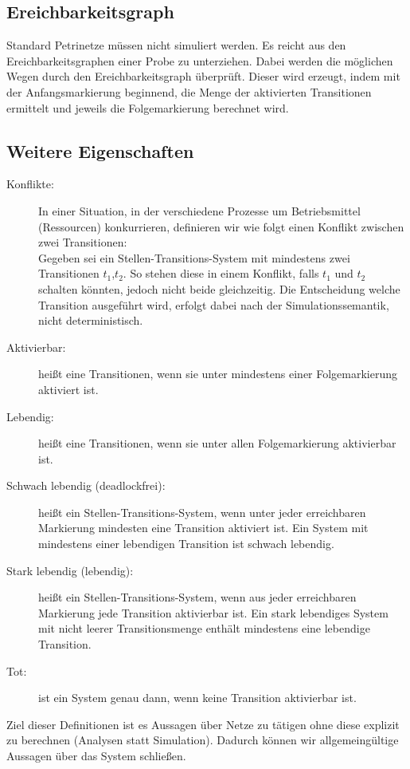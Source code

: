 \documentclass[11pt, fleqn, a4paper, leqno]{scrartcl} %
\begin{document}
	\subsection{Ereichbarkeitsgraph}
	Standard Petrinetze müssen nicht simuliert werden. Es reicht aus den Ereichbarkeitsgraphen einer Probe zu unterziehen. Dabei werden die möglichen Wegen durch den Ereichbarkeitsgraph überprüft. Dieser wird erzeugt, indem mit der Anfangsmarkierung beginnend, die Menge der aktivierten Transitionen ermittelt und jeweils die Folgemarkierung berechnet wird.
	\subsection{Weitere Eigenschaften}
	\begin{description}
		\item[Konflikte:] In einer Situation, in der verschiedene Prozesse um Betriebsmittel (Ressourcen) konkurrieren, definieren wir wie folgt einen Konflikt zwischen zwei Transitionen:\\
		Gegeben sei ein Stellen-Transitions-System mit mindestens zwei Transitionen $t_{1}$,$t_{2}$. So stehen diese in einem Konflikt, falls $t_{1}$ und $t_{2}$ schalten könnten, jedoch nicht beide gleichzeitig. Die Entscheidung welche Transition ausgeführt wird, erfolgt dabei nach der Simulationssemantik, nicht deterministisch.
		\item[Aktivierbar:] heißt eine Transitionen, wenn sie unter mindestens einer Folgemarkierung aktiviert ist.
		\item[Lebendig:] heißt eine Transitionen, wenn sie unter allen Folgemarkierung aktivierbar ist.
		\item [Schwach lebendig (deadlockfrei):] heißt ein Stellen-Transitions-System, wenn unter jeder erreichbaren Markierung mindesten eine Transition aktiviert ist. Ein System mit mindestens einer lebendigen Transition ist schwach lebendig.
		\item [Stark lebendig (lebendig):] heißt ein Stellen-Transitions-System, wenn aus jeder erreichbaren Markierung jede Transition aktivierbar ist. Ein stark lebendiges System mit nicht leerer Transitionsmenge enthält mindestens eine lebendige Transition.
		\item[Tot:] ist ein System genau dann, wenn keine Transition aktivierbar ist.
		\end{description}
		Ziel dieser Definitionen ist es Aussagen über Netze zu tätigen ohne diese explizit zu berechnen (Analysen statt Simulation). Dadurch können wir allgemeingültige Aussagen über das System schließen.
\end{document}
